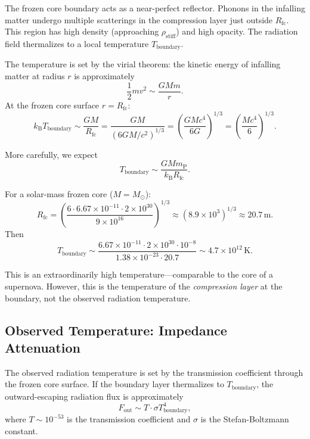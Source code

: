 \documentclass[12pt,a4paper]{article}
\newcommand{\planckmass}{m_\text{P}}
\newcommand{\rhostiff}{\rho_\text{stiff}}
\newcommand{\Rfc}{R_\text{fc}}
\theoremstyle{definition}
\begin{document}
The frozen core boundary acts as a near-perfect reflector. Phonons in the infalling matter undergo multiple scatterings in the compression layer just outside $\Rfc$. This region has high density (approaching $\rhostiff$) and high opacity. The radiation field thermalizes to a local temperature $T_\text{boundary}$.

The temperature is set by the virial theorem: the kinetic energy of infalling matter at radius $r$ is approximately
\begin{equation}
\frac{1}{2} m v^2 \sim \frac{GMm}{r}.
\end{equation}
At the frozen core surface $r = \Rfc$:
\begin{equation}
k_\text{B} T_\text{boundary} \sim \frac{GM}{R_\text{fc}} = \frac{GM}{\left(6GM/c^2\right)^{1/3}} = \left( \frac{GM c^4}{6G} \right)^{1/3} = \left( \frac{Mc^4}{6} \right)^{1/3}.
\label{eq:T_boundary_order}
\end{equation}

More carefully, we expect
\begin{equation}
T_\text{boundary} \sim \frac{GM \planckmass}{k_\text{B} \Rfc}.
\label{eq:T_boundary}
\end{equation}

For a solar-mass frozen core ($M = M_\odot$):
\begin{equation}
\Rfc = \left( \frac{6 \cdot 6.67 \times 10^{-11} \cdot 2 \times 10^{30}}{9 \times 10^{16}} \right)^{1/3} \approx (8.9 \times 10^3)^{1/3} \approx 20.7\,\text{m}.
\end{equation}
Then
\begin{equation}
T_\text{boundary} \sim \frac{6.67 \times 10^{-11} \cdot 2 \times 10^{30} \cdot 10^{-8}}{1.38 \times 10^{-23} \cdot 20.7} \sim 4.7 \times 10^{12}\,\text{K}.
\label{eq:T_boundary_solar}
\end{equation}

This is an extraordinarily high temperature—comparable to the core of a supernova. However, this is the temperature of the \emph{compression layer} at the boundary, not the observed radiation temperature.

\subsection{Observed Temperature: Impedance Attenuation}
\label{subsec:observed_temperature}

The observed radiation temperature is set by the transmission coefficient through the frozen core surface. If the boundary layer thermalizes to $T_\text{boundary}$, the outward-escaping radiation flux is approximately
\begin{equation}
F_\text{out} \sim T \cdot \sigma T_\text{boundary}^4,
\label{eq:F_out}
\end{equation}
where $T \sim 10^{-53}$ is the transmission coefficient and $\sigma$ is the Stefan-Boltzmann constant.
\end{document}
